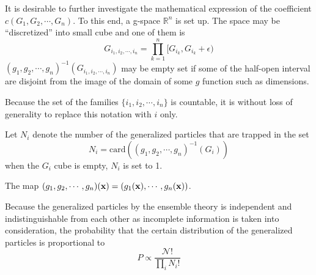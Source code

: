 It is desirable to further investigate the mathematical expression of the coefficient $c(G_1,G_2,\cdots ,G_n)$. To this end, a g-space $\mathbb R^n$ is set up. 
The space may be ``discretized'' into small cube and one of them is
\begin{equation}
    G_{i_1,i_2,\cdots ,i_n}=\prod_{k=1}^{n}[G_{i_k},G_{i_k}+\epsilon)
    \label{cubi}
\end{equation}
$(g_1,g_2,\cdots ,g_n)^{-1}(G_{i_1,i_2,\cdots ,i_n})$ may be empty set if some of the half-open interval are disjoint from the image of the domain of some $g$ function such as dimensions.

Because the set of the families $\{i_1,i_2,\cdots ,i_n\}$ is countable, it is without loss of generality to replace this notation with $i$ only.

Let $N_i$ denote the number of the generalized particles that are trapped in the set
\begin{equation}
    N_i=\text{card}((g_1,g_2,\cdots ,g_n)^{-1}(G_i))
    \label{number}
\end{equation}
when the $G_i$ cube is empty, $N_i$ is set to 1.

The map $(g_1,g_2,\cdots ,g_n)(\mathbf{x})=(g_1(\mathbf{x}),\cdots ,g_n(\mathbf{x}))$.

Because the generalized particles by the ensemble theory is independent and indistinguishable from each other as incomplete information is taken into consideration,
the probability that the certain distribution of the generalized particles is proportional to
\begin{equation}
   P\propto \frac{\mathcal N!}{\prod_{i}N_i!}
    \label{prob}
\end{equation}

